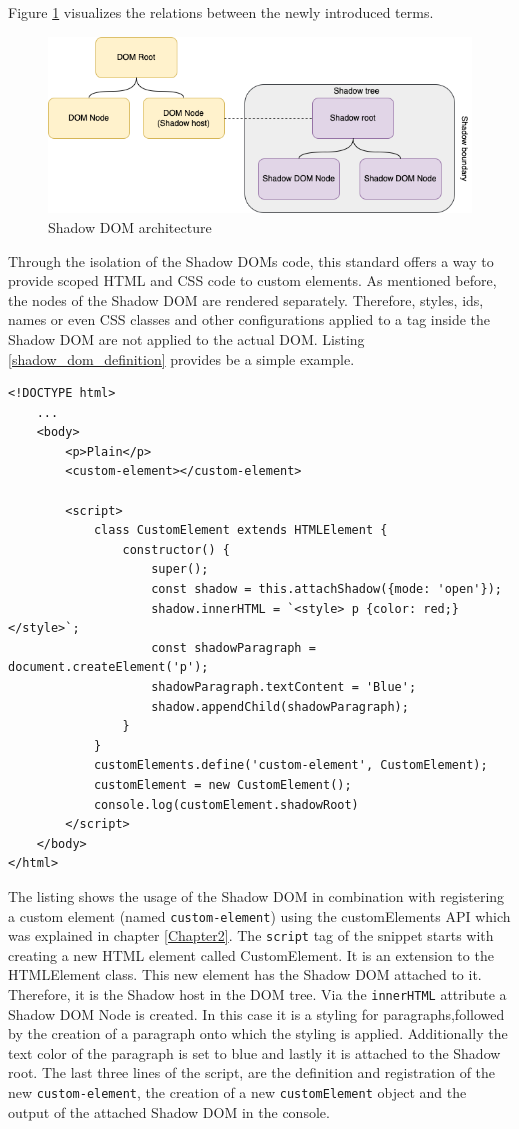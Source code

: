 Figure \ref{fig:shadow_dom} visualizes the relations between the newly introduced terms.

\begin{figure}[!h]
	\centering
	\includegraphics[width=1\textwidth]{Figures/shadow_dom.drawio.png}
	\caption{Shadow DOM architecture}
	\label{fig:shadow_dom}
\end{figure}

Through the isolation of the Shadow DOMs code, this standard offers a way to provide scoped HTML and CSS code to custom elements. As mentioned before, the nodes of the Shadow DOM are rendered separately. Therefore, styles, ids, names or even CSS classes and other configurations applied to a tag inside the Shadow DOM are not applied to the actual DOM.
Listing \ref{shadow_dom_definition} provides be a simple example.

\begin{lstlisting}[caption=Definition of a custom element using the Shadow DOM \cite{simon_thesis}, label=shadow_dom_definition]
<!DOCTYPE html> 
	...
	<body>
		<p>Plain</p> 
		<custom-element></custom-element>
		
		<script>
			class CustomElement extends HTMLElement {
				constructor() { 
					super();
					const shadow = this.attachShadow({mode: 'open'}); 
					shadow.innerHTML = `<style> p {color: red;} </style>`; 
					const shadowParagraph = document.createElement('p'); 
					shadowParagraph.textContent = 'Blue'; 
					shadow.appendChild(shadowParagraph);
				}
			}
			customElements.define('custom-element', CustomElement); 
			customElement = new CustomElement(); 
			console.log(customElement.shadowRoot)
		</script>
	</body>
</html>
\end{lstlisting}

The listing shows the usage of the Shadow DOM in combination with registering a custom element (named \texttt{custom-element}) using the customElements API which was explained in chapter \ref{Chapter2}.
The \texttt{script} tag of the snippet starts with creating a new HTML element called CustomElement. It is an extension to the HTMLElement class. This new element has the Shadow DOM attached to it. Therefore, it is the Shadow host in the DOM tree. Via the \texttt{innerHTML} attribute a Shadow DOM Node is created. In this case it is a styling for paragraphs,followed by the creation of a paragraph onto which the styling is applied. Additionally the text color of the paragraph is set to blue and lastly it is attached to the Shadow root.
The last three lines of the script, are the definition and registration of the new \texttt{custom-element}, the creation of a new \texttt{customElement} object and the output of the attached Shadow DOM in the console.

